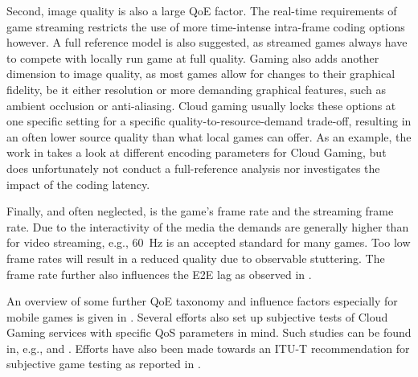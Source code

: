 

Second, image quality is also a large \gls{QoE} factor. The real-time requirements of game streaming restricts the use of more time-intense intra-frame coding options however. A full reference model is also suggested, as streamed games always have to compete with locally run game at full quality. Gaming also adds another dimension to image quality, as most games allow for changes to their graphical fidelity, be it either resolution or more demanding graphical features, such as ambient occlusion or anti-aliasing. Cloud gaming usually locks these options at one specific setting for a specific quality-to-resource-demand trade-off, resulting in an often lower source quality than what local games can offer. As an example, the work in \cite{slivarimpact} takes a look at different encoding parameters for Cloud Gaming, but does unfortunately not conduct a full-reference analysis nor investigates the impact of the coding latency.

Finally, and often neglected, is the game's frame rate and the streaming frame rate. Due to the interactivity of the media the demands are generally higher than for video streaming, e.g., \SI{60}{\hertz} is an accepted standard for many games. Too low frame rates will result in a reduced quality due to observable stuttering. The frame rate further also influences the \gls{E2E} lag as observed in \cite{metzger16lagmodel}.

An overview of some further \gls{QoE} taxonomy and influence factors especially for mobile games is given in \cite{beyer2014typedisplaydelayimpact}. Several efforts also set up subjective tests of Cloud Gaming services with specific \gls{QoS} parameters in mind. Such studies can be found in, e.g., \cite{Jarschel20132883} and  \cite{6614351}. Efforts have also been made towards an \acrshort{ITU-T} recommendation for subjective game testing as reported in \cite{mollertowards}.





